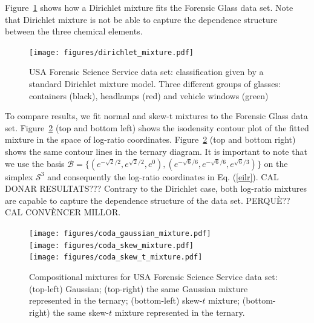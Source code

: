 \documentclass[preprint, review, 3p, authoryear]{elsarticle}
\begin{document}
Figure~\ref{fig06fittingdirichlet} shows how a Dirichlet mixture fits
the Forensic Glass data set. Note that Dirichlet mixture is not be able to capture the dependence structure between the three chemical elements. 

\begin{figure}[htbp]
\centering
\texttt{[image: figures/dirichlet\_mixture.pdf]}
\caption{USA Forensic Science Service data set: classification given by a standard Dirichlet mixture model. Three different groups of glasses: containers (black), headlamps (red) and vehicle windows (green)}
\label{fig06fittingdirichlet}
\end{figure}

To compare results, we fit normal and skew-t mixtures to the Forensic Glass data set. Figure~\ref{fig07fittingcodaGaussian} (top and bottom left) shows the isodensity contour plot of the fitted mixture in the space of log-ratio coordinates. Figure~\ref{fig07fittingcodaGaussian} (top and bottom right) shows the same contour lines in the ternary diagram.  It is important to note that we use the basis $\mathcal{B} = \{ (e^{-\sqrt{2}/2}, e^{\sqrt{2}/2}, e^{0}), (e^{-\sqrt{6}/6}, e^{-\sqrt{6}/6}, e^{\sqrt{6}/3}) \}$ on the simplex $\mathcal{S}^3$ and consequently the log-ratio coordinates in Eq. (\ref{eilr}). CAL DONAR RESULTATS??? Contrary to the Dirichlet case, both log-ratio mixtures are capable to capture the dependence structure of the data set. PERQU\`{E}?? CAL CONV\`{E}NCER MILLOR.


\begin{figure}[htbp]
\centering
\texttt{[image: figures/coda\_gaussian\_mixture.pdf]}\\%
\texttt{[image: figures/coda\_skew\_mixture.pdf]}\\%
\texttt{[image: figures/coda\_skew\_t\_mixture.pdf]}%
\caption{Compositional mixtures for USA Forensic Science Service data set: (top-left) Gaussian; (top-right) the same Gaussian mixture represented in the ternary; (bottom-left) skew-$t$ mixture; (bottom-right) the same skew-$t$ mixture represented in the ternary. }
\label{fig07fittingcodaGaussian}
\end{figure}
\end{document}
